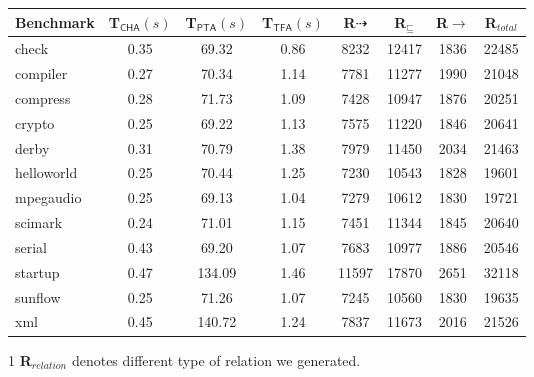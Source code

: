 \documentclass{article}
\newcommand{\less}{\sqsubseteq}
\newcommand{\tflow}{\dashrightarrow}
\begin{document}
\begin{table}[!htbp]\centering
\begin{threeparttable}[b]
\begin{tabular}{lccccccc}
	\hline
	\textbf{Benchmark} & \hspace{5pt}\textbf{T$_{\textsf{CHA}}(s)$}& \hspace{5pt}\textbf{T$_{\textsf{PTA}}(s)$} & \hspace{5pt}\textbf{T$_{\textsf{TFA}}(s)$} & \hspace{10pt}\textbf{R${\tflow}$}\hspace{10pt} & \hspace{10pt}\textbf{R$_{\less}$}\hspace{10pt} & \hspace{10pt}\textbf{R${\rightarrow}$}\hspace{10pt} &\textbf{R$_{total}$}\\
	\hline
check & 0.35 & 69.32 & 0.86 & 8232 & 12417 & 1836 & 22485\\
compiler & 0.27 & 70.34 & 1.14 & 7781 & 11277 & 1990 & 21048\\
compress & 0.28 & 71.73 & 1.09 & 7428 & 10947 & 1876 & 20251\\
crypto & 0.25 & 69.22 & 1.13 & 7575 & 11220 & 1846 & 20641\\
derby & 0.31 & 70.79 & 1.38 & 7979 & 11450 & 2034 & 21463\\
helloworld & 0.25 & 70.44 & 1.25 & 7230 & 10543 & 1828 & 19601\\
mpegaudio & 0.25 & 69.13 & 1.04 & 7279 & 10612 & 1830 & 19721\\
scimark & 0.24 & 71.01 & 1.15 & 7451 & 11344 & 1845 & 20640\\
serial & 0.43 & 69.20 & 1.07 & 7683 & 10977 & 1886 & 20546\\
startup & 0.47 & 134.09 & 1.46 & 11597 & 17870 & 2651 & 32118\\
sunflow & 0.25 & 71.26 & 1.07 & 7245 & 10560 & 1830 & 19635\\
xml & 0.45 & 140.72 & 1.24 & 7837 & 11673 & 2016 & 21526\\
	\hline
\end{tabular}
\begin{tablenotes}
  \item[1] \textbf{R}$_{relation}$ denotes different type of relation we generated.
\end{tablenotes}
\end{threeparttable}
\end{table}
\end{document}
